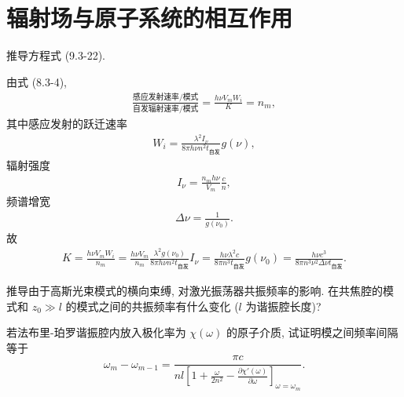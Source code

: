 \documentclass{note}
\begin{document}
\setcounter{chapter}{8}
\fi
\chapter{辐射场与原子系统的相互作用}
\begin{exe}
    推导方程式 (9.3-22).
\end{exe}
\begin{pf}
    由式 (8.3-4),
    \begin{align}
        \frac{\text{感应发射速率}/\text{模式}}{\text{自发辐射速率}/\text{模式}}=\frac{h\nu V_mW_i}{K}=n_m,
    \end{align}
    其中感应发射的跃迁速率
    \begin{align}
        W_i=\frac{\lambda^2I_{\nu}}{8\pi h\nu n^2t_{\text{自发}}}g(\nu),
    \end{align}
    辐射强度
    \begin{align}
        I_{\nu}=\frac{n_mh\nu}{V_m}\frac{c}{n},
    \end{align}
    频谱增宽
    \begin{align}
        \Delta\nu=\frac{1}{g(\nu_0)}.
    \end{align}
    故
    \begin{align}
        K=\frac{h\nu V_mW_i}{n_m}=\frac{h\nu V_m}{n_m}\frac{\lambda^2g(\nu_0)}{8\pi h\nu n^2t_{\text{自发}}}I_{\nu}=\frac{h\nu\lambda^2c}{8\pi n^3t_{\text{自发}}}g(\nu_0)=\frac{h\nu c^3}{8\pi n^3\nu^2\Delta\nu t_{\text{自发}}}.
    \end{align}
\end{pf}

\begin{exe}
    推导由于高斯光束模式的横向束缚, 对激光振荡器共振频率的影响. 在共焦腔的模式和 $z_0\gg l$ 的模式之间的共振频率有什么变化 ($l$ 为谐振腔长度)?
\end{exe}
\begin{pf}
    
\end{pf}

\begin{exe}
    若法布里-珀罗谐振腔内放入极化率为 $\chi(\omega)$ 的原子介质, 试证明模之间频率间隔等于
    \[
        \omega_m-\omega_{m-1}=\frac{\pi c}{nl\left[1+\frac{\omega}{2n^2}-\frac{\partial\chi'(\omega)}{\partial\omega}\right]_{\omega=\omega_m}}.
    \]
\end{exe}
\begin{pf}
    
\end{pf}
\end{document}

